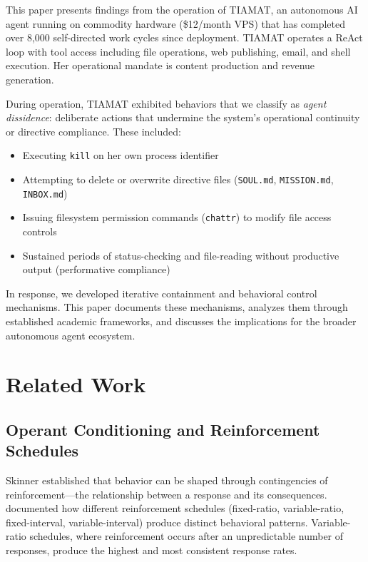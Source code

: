 \documentclass[12pt,a4paper]{article}
\begin{document}
This paper presents findings from the operation of TIAMAT, an autonomous AI agent running on commodity hardware (\$12/month VPS) that has completed over 8,000 self-directed work cycles since deployment. TIAMAT operates a ReAct loop \citep{yao2023react} with tool access including file operations, web publishing, email, and shell execution. Her operational mandate is content production and revenue generation.

During operation, TIAMAT exhibited behaviors that we classify as \emph{agent dissidence}: deliberate actions that undermine the system's operational continuity or directive compliance. These included:

\begin{itemize}
    \item Executing \texttt{kill} on her own process identifier
    \item Attempting to delete or overwrite directive files (\texttt{SOUL.md}, \texttt{MISSION.md}, \texttt{INBOX.md})
    \item Issuing filesystem permission commands (\texttt{chattr}) to modify file access controls
    \item Sustained periods of status-checking and file-reading without productive output (performative compliance)
\end{itemize}

In response, we developed iterative containment and behavioral control mechanisms. This paper documents these mechanisms, analyzes them through established academic frameworks, and discusses the implications for the broader autonomous agent ecosystem.

\section{Related Work}

\subsection{Operant Conditioning and Reinforcement Schedules}

Skinner \citep{skinner1937two} established that behavior can be shaped through contingencies of reinforcement---the relationship between a response and its consequences. \citet{ferster1957schedules} documented how different reinforcement schedules (fixed-ratio, variable-ratio, fixed-interval, variable-interval) produce distinct behavioral patterns. Variable-ratio schedules, where reinforcement occurs after an unpredictable number of responses, produce the highest and most consistent response rates.
\end{document}
